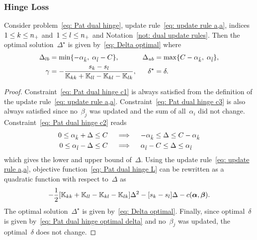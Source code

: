 \subsubsection{Hinge Loss}

\begin{lemma}\label{thm: patmat family hinge update a,a}
  Consider problem~\eqref{eq: Pat dual hinge}, update rule~\eqref{eq: update rule a,a}, indices~$1 \leq k \leq n_{+}$ and~$1 \leq l \leq n_{+}$  and Notation~\ref{not: dual update rules}. Then the optimal solution~$\Delta^{\star}$ is given by~\eqref{eq: Delta optimal} where
  \begin{align*}
    \Delta_{lb} & = \min\{- \alpha_{\hat{k}},\; \alpha_{\hat{l}} - C\}, &
    \Delta_{ub} & = \max\{C - \alpha_{\hat{k}},\; \alpha_{\hat{l}}\}, \\
    \gamma & = -\frac{s_k - s_l}{\mathbb{K}_{kk} + \mathbb{K}_{ll} - \mathbb{K}_{kl} - \mathbb{K}_{lk}}, &
    \delta^{\star} & = \delta.
  \end{align*}
\end{lemma}

\begin{proof}
  Constraint~\eqref{eq: Pat dual hinge c1} is always satisfied from the definition of the update rule~\eqref{eq: update rule a,a}. Constraint~\eqref{eq: Pat dual hinge c3} is also always satisfied since no~$\beta_j$ was updated and the sum of all~$\alpha_i$ did not change. Constraint~\eqref{eq: Pat dual hinge c2} reads
  \begin{align*}
    0 \leq \alpha_{\hat{k}} + \Delta \leq C
    & \quad \implies \quad
    - \alpha_{\hat{k}} \leq \Delta \leq C - \alpha_{\hat{k}} \\
    0 \leq \alpha_{\hat{l}} - \Delta \leq C
    & \quad \implies \quad
    \alpha_{\hat{l}} - C \leq \Delta \leq \alpha_{\hat{l}}
  \end{align*}
  which gives the lower and upper bound of~$\Delta.$ Using the update rule~\eqref{eq: update rule a,a}, objective function~\eqref{eq: Pat dual hinge L} can be rewritten as a quadratic function with respect to~$\Delta$ as
  \begin{equation*}
    - \frac{1}{2} \Brac[s]{\K_{kk} + \K_{ll} - \K_{kl} - \K_{lk}} \Delta^2
    - \Brac[s]{s_k - s_l} \Delta
    - c(\bm{\alpha}, \bm{\beta}).
  \end{equation*}
  The optimal solution~$\Delta^{\star}$ is given by~\eqref{eq: Delta optimal}. Finally, since optimal~$\delta$ is given by~\eqref{eq: Pat dual hinge optimal delta} and no~$\beta_j$ was updated, the optimal~$\delta$ does not change.
\end{proof}

